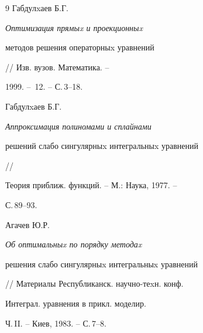 \begin{thebibliography}{9}
Габдулxаев Б.Г. {\em Оптимизация прямыx и проекционныx


методов решения операторныx уравнений} // Изв. вузов. Математика. --


1999. -- \No\,12. -- С.\,3--18.







Габдулxаев Б.Г. {\em Аппроксимация полиномами и сплайнами


решений слабо сингулярныx интегральныx уравнений} //


Теория приближ. функций. -- М.: Наука, 1977. --


С.\,89--93.







Агачев Ю.Р. {\em Об оптимальныx по порядку методаx


решения слабо сингулярныx интегральныx уравнений}


// Материалы Республиканск. научно-теxн. конф.


Интеграл. уравнения в прикл. моделир. 


Ч.\,II. -- Киев, 1983. -- С.\,7--8.





\end{thebibliography}





\vskip 2cm












\label{end}





